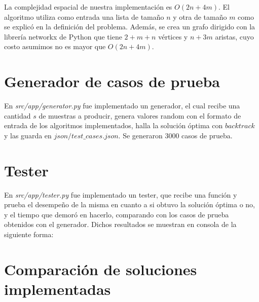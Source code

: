 \documentclass[10pt]{article} %
\begin{document}
	La complejidad espacial de nuestra implementaci\'on es $O(2n + 4m)$. El algoritmo utiliza como entrada una lista de tama\~no $n$ y otra de tama\~no $m$ como se explic\'o en la definici\'on del problema. Adem\'as, se crea un grafo dirigido con la librer\'ia networkx de Python que tiene $2 + m + n$ v\'ertices y $n + 3m$ aristas, cuyo costo asumimos no es mayor que $O(2n + 4m)$.
		
	\section{Generador de casos de prueba}
	
	En \textit{src/app/generator.py} fue implementado un generador, el cual recibe una cantidad $ s $ de muestras a producir, genera valores random con el formato de entrada de los algoritmos implementados, halla la soluci\'on \'optima con $ backtrack $ y las guarda en $ json/test\_cases.json $. Se generaron 3000 casos de prueba.
	
	\section{Tester}
	En \textit{src/app/tester.py} fue implementado un tester, que recibe una funci\'on y prueba el desempe\~no de la misma en cuanto a si obtuvo la soluci\'on \'optima o no, y el tiempo que demor\'o en hacerlo, comparando con los casos de prueba obtenidos con el generador. Dichos resultados se muestran en consola de la siguiente forma:
%	 		
	 
	
	\section{Comparaci\'on de soluciones implementadas}
	
\end{document}
